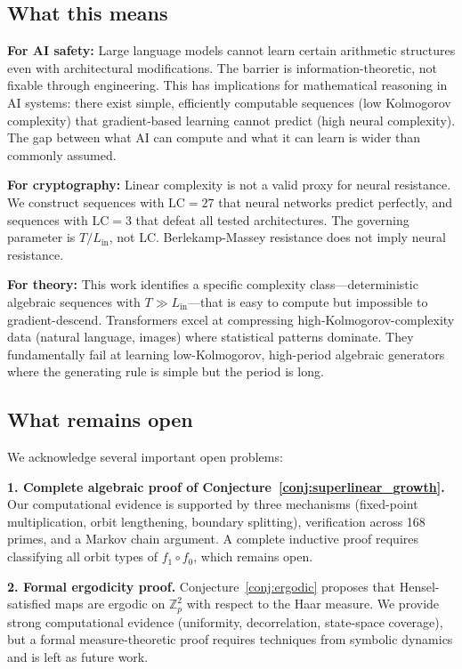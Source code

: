 \documentclass[11pt]{article}
\theoremstyle{plain}
\theoremstyle{definition}
\newcommand{\Z}{\mathbb{Z}}
\newcommand{\LC}{\mathrm{LC}}
\begin{document}
\subsection{What this means}

\textbf{For AI safety:} Large language models cannot learn certain arithmetic structures even with architectural modifications. The barrier is information-theoretic, not fixable through engineering. This has implications for mathematical reasoning in AI systems: there exist simple, efficiently computable sequences (low Kolmogorov complexity) that gradient-based learning cannot predict (high neural complexity). The gap between what AI can compute and what it can learn is wider than commonly assumed.

\textbf{For cryptography:} Linear complexity is not a valid proxy for neural resistance. We construct sequences with $\LC = 27$ that neural networks predict perfectly, and sequences with $\LC = 3$ that defeat all tested architectures. The governing parameter is $T/L_{\mathrm{in}}$, not LC. Berlekamp-Massey resistance does not imply neural resistance.

\textbf{For theory:} This work identifies a specific complexity class—deterministic algebraic sequences with $T \gg L_{\mathrm{in}}$—that is easy to compute but impossible to gradient-descend. Transformers excel at compressing high-Kolmogorov-complexity data (natural language, images) where statistical patterns dominate. They fundamentally fail at learning low-Kolmogorov, high-period algebraic generators where the generating rule is simple but the period is long.

\subsection{What remains open}

We acknowledge several important open problems:

\textbf{1. Complete algebraic proof of Conjecture~\ref{conj:superlinear_growth}.} Our computational evidence is supported by three mechanisms (fixed-point multiplication, orbit lengthening, boundary splitting), verification across 168 primes, and a Markov chain argument. A complete inductive proof requires classifying all orbit types of $f_1 \circ f_0$, which remains open.

\textbf{2. Formal ergodicity proof.} Conjecture~\ref{conj:ergodic} proposes that Hensel-satisfied maps are ergodic on $\Z_p^2$ with respect to the Haar measure. We provide strong computational evidence (uniformity, decorrelation, state-space coverage), but a formal measure-theoretic proof requires techniques from symbolic dynamics and is left as future work.
\end{document}
